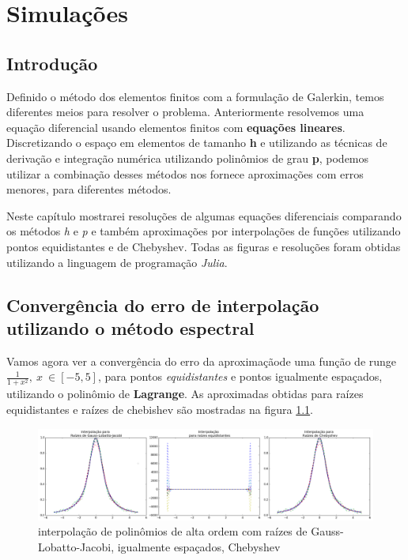 \chapter{Simulações}   
\label{cap:III}
\section{Introdução}
 Definido o método dos elementos finitos com a formulação de Galerkin, temos diferentes meios para resolver o problema. Anteriormente resolvemos uma equação diferencial usando elementos finitos com \textbf{equações lineares}. Discretizando o espaço em elementos de tamanho \textbf{h} e utilizando as técnicas de derivação e integração numérica utilizando polinômios de grau \textbf{p}, podemos utilizar a combinação desses métodos nos fornece aproximações com erros menores, para diferentes métodos.
 
 Neste capítulo mostrarei resoluções de algumas equações diferenciais comparando os métodos \emph{h} e \emph{p}  e também aproximações por interpolações de funções utilizando pontos equidistantes e de Chebyshev. Todas as figuras e resoluções foram obtidas utilizando a linguagem de programação \emph{Julia}.

\section{Convergência do erro de interpolação utilizando o método espectral}
	Vamos agora ver a convergência do erro da aproximaçãode uma função de runge $\frac{1}{1+x^2},\ x\ \in [-5,5]$, para pontos \emph{equidistantes} e pontos igualmente espaçados, utilizando o polinômio de \textbf{Lagrange}.
	As aproximadas obtidas para raízes equidistantes e raízes de chebishev são mostradas na figura \ref{fig:interp}.	
\begin{figure}[!ht]
  \includegraphics[width=1.25\textwidth,center]{figuras/interpolacao_todas.png}
  \caption{interpolação de polinômios de alta ordem com raízes de Gauss-Lobatto-Jacobi, igualmente espaçados, Chebyshev}
\label{fig:interp}
\end{figure}

